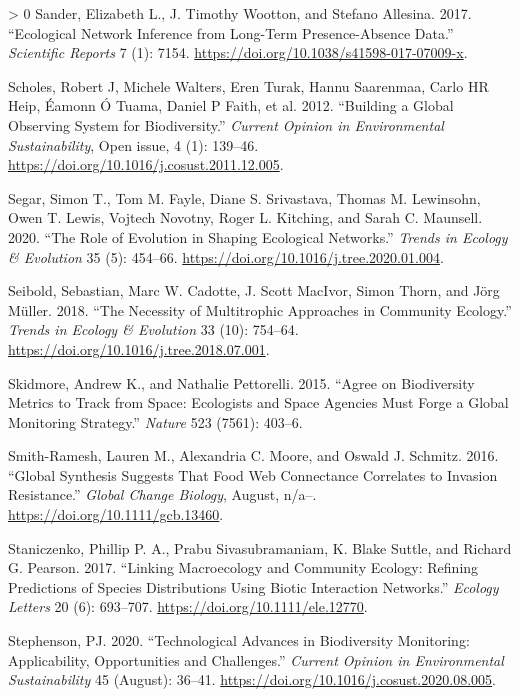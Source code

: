 \documentclass[10pt,oneside]{article}
\newlength{\cslhangindent}
\newenvironment{CSLReferences}[3] %
 {%
  \setlength{\parindent}{0pt}
  \ifodd #1 \everypar{\setlength{\hangindent}{\cslhangindent}}\ignorespaces\fi
  \ifnum #2 > 0
  \setlength{\parskip}{#2\baselineskip}
  \fi
 }%
 {}
\begin{document}
\begin{CSLReferences}{1}{0}
\leavevmode\hypertarget{ref-Sander2017EcoNet}{}%
Sander, Elizabeth L., J. Timothy Wootton, and Stefano Allesina. 2017.
{``Ecological Network Inference from Long-Term Presence-Absence Data.''}
\emph{Scientific Reports} 7 (1): 7154.
\url{https://doi.org/10.1038/s41598-017-07009-x}.

\leavevmode\hypertarget{ref-Scholes2012BuiGlo}{}%
Scholes, Robert J, Michele Walters, Eren Turak, Hannu Saarenmaa, Carlo
HR Heip, Éamonn Ó Tuama, Daniel P Faith, et al. 2012. {``Building a
Global Observing System for Biodiversity.''} \emph{Current Opinion in
Environmental Sustainability}, Open issue, 4 (1): 139--46.
\url{https://doi.org/10.1016/j.cosust.2011.12.005}.

\leavevmode\hypertarget{ref-Segar2020RolEvo}{}%
Segar, Simon T., Tom M. Fayle, Diane S. Srivastava, Thomas M. Lewinsohn,
Owen T. Lewis, Vojtech Novotny, Roger L. Kitching, and Sarah C.
Maunsell. 2020. {``The Role of Evolution in Shaping Ecological
Networks.''} \emph{Trends in Ecology \& Evolution} 35 (5): 454--66.
\url{https://doi.org/10.1016/j.tree.2020.01.004}.

\leavevmode\hypertarget{ref-Seibold2018NecMul}{}%
Seibold, Sebastian, Marc W. Cadotte, J. Scott MacIvor, Simon Thorn, and
Jörg Müller. 2018. {``The Necessity of Multitrophic Approaches in
Community Ecology.''} \emph{Trends in Ecology \& Evolution} 33 (10):
754--64. \url{https://doi.org/10.1016/j.tree.2018.07.001}.

\leavevmode\hypertarget{ref-Skidmore2015AgrBio}{}%
Skidmore, Andrew K., and Nathalie Pettorelli. 2015. {``Agree on
Biodiversity Metrics to Track from Space: Ecologists and Space Agencies
Must Forge a Global Monitoring Strategy.''} \emph{Nature} 523 (7561):
403--6.

\leavevmode\hypertarget{ref-Smith-Ramesh2016GloSyn}{}%
Smith-Ramesh, Lauren M., Alexandria C. Moore, and Oswald J. Schmitz.
2016. {``Global Synthesis Suggests That Food Web Connectance Correlates
to Invasion Resistance.''} \emph{Global Change Biology}, August, n/a--.
\url{https://doi.org/10.1111/gcb.13460}.

\leavevmode\hypertarget{ref-Staniczenko2017LinMac}{}%
Staniczenko, Phillip P. A., Prabu Sivasubramaniam, K. Blake Suttle, and
Richard G. Pearson. 2017. {``Linking Macroecology and Community Ecology:
Refining Predictions of Species Distributions Using Biotic Interaction
Networks.''} \emph{Ecology Letters} 20 (6): 693--707.
\url{https://doi.org/10.1111/ele.12770}.

\leavevmode\hypertarget{ref-Stephenson2020TecAdv}{}%
Stephenson, PJ. 2020. {``Technological Advances in Biodiversity
Monitoring: Applicability, Opportunities and Challenges.''}
\emph{Current Opinion in Environmental Sustainability} 45 (August):
36--41. \url{https://doi.org/10.1016/j.cosust.2020.08.005}.


\end{CSLReferences}
\end{document}
